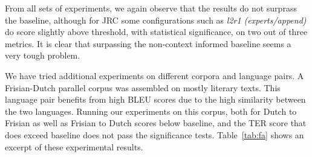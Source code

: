 From all sets of experiments, we again observe that the results do not surprass
the baseline, although for JRC some configurations such as \emph{l2r1
\footnotesize{(experts/append)}} do score slightly above threshold, with statistical
significance, on two out of three metrics. It is clear that surpassing the
non-context informed baseline seems a very tough problem.


We have tried additional experiments on different corpora and language pairs. A
Frisian-Dutch parallel corpus was assembled on mostly literary texts. This
language pair benefits from high BLEU scores due to the high similarity between
the two languages. Running our experiments on this corpus, both for Dutch to
Frisian as well as Frisian to Dutch scores below baseline, and the TER score
that does exceed baseline does not pass the significance tests.
Table~\ref{tab:fa} shows an excerpt of these experimental results.

\begin{table}
\noindent{}
\caption{An excerpt of the results on the Frisian parallel corpus, Dutch to Frisian and Frisian to Dutch. For the latter, no METEOR scores are available} %
\label{tab:fa}
\end{table}

